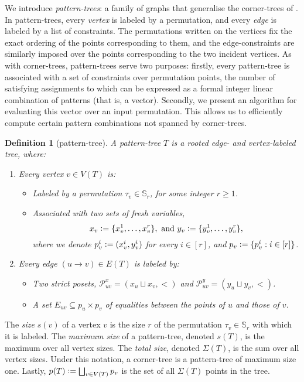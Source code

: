 \documentclass{article}
\newtheorem{definition}[theorem]{Definition}
\newcommand{\eqdef}{\vcentcolon=}
\theoremstyle{remark}
\theoremstyle{plain}
\begin{document}
We introduce \emph{pattern-trees}: a family of graphs that generalise the corner-trees of \cite{even2021counting}.
In pattern-trees, every \textit{vertex} is labeled by a permutation, and every \textit{edge} 
is labeled by a list of constraints. 
The permutations written on the vertices fix the exact ordering of the points corresponding to them,
and the edge-constraints are similarly imposed over the points corresponding to the two incident vertices.  
As with corner-trees, pattern-trees serve two purposes:
firstly, every pattern-tree is associated with a set of constraints over permutation points, the
number of satisfying assignments to which can be expressed as a formal integer linear combination of patterns (that is, a vector).
Secondly, we present an algorithm for evaluating this vector over an input permutation.
This allows us to efficiently compute certain pattern combinations not spanned by corner-trees.
\begin{definition}[pattern-tree]
    \label{defn:pattern_tree}
    A pattern-tree $T$ is a rooted edge- and vertex-labeled tree, where:
    \begin{enumerate}
        \item Every vertex $v \in V(T)$ is:
        \begin{itemize}
            \item Labeled by a permutation $\tau_v \in \mathbb{S}_r$, for some integer $r \ge 1$.
            \item Associated with two sets of \textit{fresh} variables, 
            \[ x_v \eqdef \{ x_v^1, \dots, x_v^r \}, \text{ and } y_v \eqdef \{ y_v^1, \dots, y_v^r\}, \]
            where we denote $p_v^i \eqdef (x_v^i, y_v^i)$ for every $i \in [r]$, and $p_v \eqdef \{ p_v^i : i \in [r] \}$.
        \end{itemize}
        \item Every edge $(u \to v) \in E(T)$ is labeled by:
        \begin{itemize}
            \item Two strict posets, $\mathcal{P}^x_{uv} = (x_u \sqcup x_v, <)$ and $\mathcal{P}^y_{uv}=(y_u \sqcup y_v, <)$.
            \item A set $E_{uv} \subseteq p_u \times p_v$ of equalities between the points of $u$ and those of $v$.
        \end{itemize}
    \end{enumerate}
\end{definition}
The \emph{size} $s(v)$ of a vertex $v$ is the size $r$ of the permutation $\tau_v \in \mathbb{S}_r$ with which it is labeled. The \emph{maximum size} of a pattern-tree, denoted $s(T)$, is the maximum over all vertex sizes. The \emph{total size}, denoted $\Sigma(T)$, is the sum over all vertex sizes. Under this notation, a corner-tree is a pattern-tree of maximum size one. Lastly, $p(T) \eqdef \bigsqcup_{v \in V(T)} p_v$ is the set of all $\Sigma(T)$ points in the tree.
\end{document}
